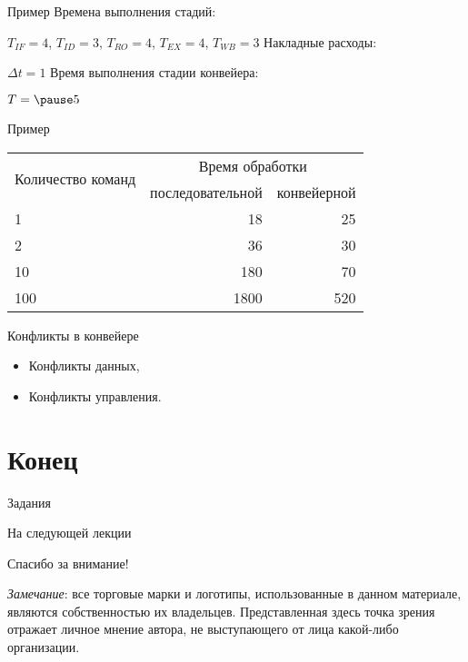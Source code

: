 \begin{frame}{Пример}
Времена выполнения стадий:

$T_{IF} = 4$, $T_{ID} = 3$, $T_{RO} = 4$, $T_{EX} = 4$, $T_{WB} = 3$
\vfill
Накладные расходы:

$\Delta t = 1$
\vfill
Время выполнения стадии конвейера:

$T = \pause5$
\end{frame}

\begin{frame}{Пример}
\begin{table}[htpb]
    \centering
    \begin{tabular}{|l|r|r|}
    \hline
    \multirow{2}{*}{Количество команд}   &   \multicolumn{2}{c|}{Время обработки} \\
    \cline{2-3}
                        &   последовательной    &   конвейерной \\
    \hline
    1                   &   18                  &   25          \\
    \hline
    2                   &   36                  &   30          \\
    \hline
    10                  &   180                 &   70          \\
    \hline
    100                 &   1800                &   520         \\
    \hline
    \end{tabular}
\end{table}
\end{frame}

\begin{frame}{Конфликты в конвейере}
\begin{itemize}
    \item Конфликты данных,
    \item Конфликты управления.
\end{itemize}
\end{frame}

\section*{Конец}

\begin{frame}{Задания}
\end{frame}

\begin{frame}{На следующей лекции}
\end{frame}

\begin{frame}

{\huge{Спасибо за внимание!}\par}

\vfill

\tiny{\textit{Замечание}: все торговые марки и логотипы, использованные в данном материале, являются собственностью их владельцев. Представленная здесь точка зрения отражает личное мнение автора, не выступающего от лица какой-либо организации.}

\end{frame}


